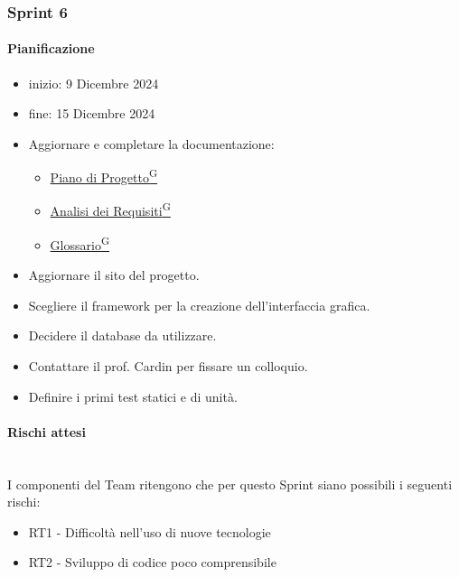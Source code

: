 \documentclass{article}
\begin{document}
            \subsubsection{Sprint 6}
                \paragraph{Pianificazione}
                \begin{itemize}
                    \item inizio: 9 Dicembre 2024
                    \item fine: 15 Dicembre 2024
                \end{itemize}
                \begin{itemize}
                    \item Aggiornare e completare la documentazione:
                    \begin{itemize}
                        \item \href{https://code7crusaders.github.io/docs/PB/documentazione_interna/glossario.html#piano-di-progetto}{Piano di Progetto\textsuperscript{G}}
                        \item \href{https://code7crusaders.github.io/docs/PB/documentazione_interna/glossario.html#analisi-dei-requisiti}{Analisi dei Requisiti\textsuperscript{G}}
                        \item \href{https://code7crusaders.github.io/docs/PB/documentazione_interna/glossario.html#glossario}{Glossario\textsuperscript{G}}
                    \end{itemize}
                    \item Aggiornare il sito del progetto.
                    \item Scegliere il framework per la creazione dell'interfaccia grafica.
                    \item Decidere il database da utilizzare.
                    \item Contattare il prof. Cardin per fissare un colloquio.
                    \item Definire i primi test statici e di unità.
                \end{itemize}


                \paragraph{Rischi attesi}\mbox{}\\
                I componenti del Team ritengono che per questo Sprint siano possibili i seguenti rischi:
                \begin{itemize}
                    \item RT1 - Difficoltà nell’uso di nuove tecnologie
                    \item RT2 - Sviluppo di codice poco comprensibile
                \end{itemize}
\end{document}
